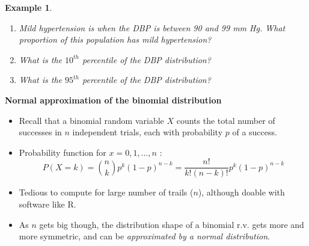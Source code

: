 \documentclass[12pt]{amsart}
\newtheorem{example}[theorem]{Example}
\newcommand{\m}{\mu}
\newcommand{\s}{\sigma}
\newcommand{\bP}{\mathbb{P}}
\begin{document}
{\begin{example}
\begin{enumerate}
\item Mild hypertension is when the DBP is between 90 and 99 mm Hg. What proportion of this population has mild hypertension?

%

\vfill

\item What is the $10^{th}$ percentile of the DBP distribution?

%

\vfill

\item What is the $95^{th}$ percentile of the DBP distribution?

%
%


\vfill
\end{enumerate}

\end{example} 


\newpage
\textbf{Normal approximation of the binomial distribution} \newline


\begin{itemize}
\item Recall that a binomial random variable $X$ counts the total number of successes in $n$ independent trials, each with probability $p$ of a success. 
\item Probability function for $x = 0, 1, ..., n$ :
$$P(X = k) = {n\choose k}p^k(1-p)^{n-k} = \frac{n!}{k!(n-k)!}p^k(1-p)^{n-k}$$
\item Tedious to compute for large number of trails ($n$), although doable with software like R. 
\item As $n$ gets big though, the distribution shape of a binomial r.v. gets more and more symmetric, and can be \textit{approximated by a normal distribution}.
\end{itemize}




}
\end{document}

